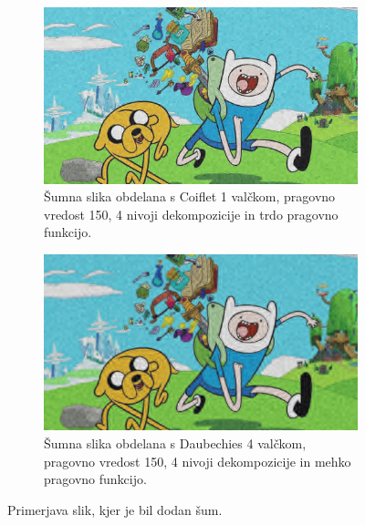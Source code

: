 \documentclass[a4paper,11pt]{article}
\begin{document}
\begin{figure}
\begin{subfigure}[t]{0.48\textwidth}
\includegraphics[width=1\textwidth]{images/report/noisy_nrmse_comp.jpg}
\caption{Šumna slika obdelana s Coiflet 1 valčkom, pragovno vredost 150, 4 nivoji dekompozicije in trdo pragovno funkcijo.} \label{noisy:comp:nrmse}
\end{subfigure}
\hspace*{\fill} %
\begin{subfigure}[t]{0.48\textwidth}
\includegraphics[width=1\textwidth]{images/report/noisy_pearson_comp.jpg}
\caption{Šumna slika obdelana s Daubechies 4 valčkom, pragovno vredost 150, 4 nivoji dekompozicije in mehko pragovno funkcijo.} \label{noisy:comp:pearson}
\end{subfigure}
\caption{Primerjava slik, kjer je bil dodan šum.} \label{noisy:cmp}
\end{figure}
\end{document}
